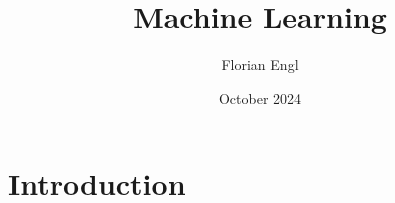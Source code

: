 \documentclass{article}
\title{Machine Learning}
\author{Florian Engl}
\date{October 2024}
\begin{document}
\maketitle

\section{Introduction}
\end{document}
